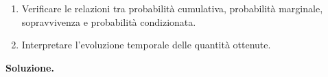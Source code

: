 \begin{exercise}
\begin{enumerate}
\begin{itemize}
\item la probabilit\`{a} marginale di default
$\mathrm{PD}_{2}^{\mathrm{marg}}(h)$;

\item la probabilit\`{a} di sopravvivenza $S_2(h)$;

\item la probabilit\`{a} condizionata di default $q_2(h)$.

\end{itemize}

\item Verificare le relazioni tra probabilit\`{a} cumulativa,
probabilit\`{a} marginale, sopravvivenza e probabilit\`{a}
condizionata.

\item Interpretare l'evoluzione temporale delle quantit\`{a} ottenute.

\end{enumerate}

\end{exercise}

\noindent
\textbf{Soluzione.}


